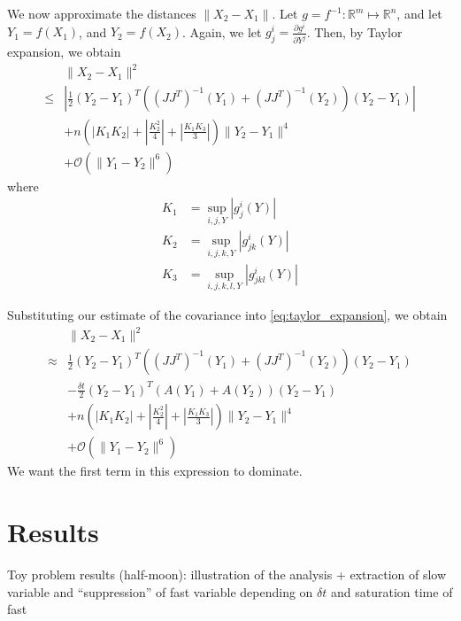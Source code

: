 \documentclass[1p]{elsarticle}
\begin{document}
We now approximate the distances $\| X_2 - X_1 \|$.
%
Let $g = f^{-1}: \mathbb{R}^m \mapsto \mathbb{R}^n$, and let $Y_1 = f(X_1)$, and $Y_2 = f(X_2)$.
%
Again, we let $g_j^i = \frac{\partial g^i}{\partial Y^j}$.
%
Then, by Taylor expansion, we obtain
\begin{equation} \label{eq:taylor_expansion}
\begin{aligned}
&\| X_2 - X_1 \|^2 \\
\le&  \left| \frac{1}{2} (Y_2 - Y_1 )^T ((J J^T)^{-1} (Y_1) + (J J^T)^{-1}(Y_2)) (Y_2 - Y_1 ) \right| \\
& + n \left( \left| K_1 K_2 \right| + \left| \frac{ K_2^2}{4} \right|  + \left| \frac{K_1 K_3}{3} \right|  \right) \| Y_2 - Y_1 \| ^4  \\
& + \mathcal{O} (\|Y_1 - Y_2 \|^6 ) 
\end{aligned}
\end{equation}
%
where
%
\begin{equation}
\begin{aligned}
K_1 &= \sup_{i,j,Y} |g_j^i(Y)|\\
K_2 &= \sup_{i,j,k,Y} |g_{jk}^i(Y)|\\
K_3 &= \sup_{i,j,k,l,Y} |g_{jkl}^i(Y)|
\end{aligned}
\end{equation}

Substituting our estimate of the covariance into \eqref{eq:taylor_expansion}, we obtain
\begin{equation}
\begin{aligned}
&\| X_2 - X_1 \|^2 \\
\approx &  \frac{1}{2} (Y_2 - Y_1)^T \left((J J^T)^{-1}(Y_1)  + (J J^T)^{-1}(Y_2) \right) (Y_2 - Y_1) \\
& - \frac{\delta t}{2} (Y_2 - Y_1)^T \left( A(Y_1) + A(Y_2) \right) (Y_2 - Y_1)\\
& + n \left( \left| K_1 K_2 \right| + \left| \frac{ K_2^2}{4} \right|  + \left| \frac{K_1 K_3}{3} \right|  \right) \| Y_2 - Y_1 \| ^4  \\
& + \mathcal{O} (\|Y_1 - Y_2 \|^6 ) 
\end{aligned}
\end{equation}
%
We want the first term in this expression to dominate.


\section{Results}

 Toy problem results (half-moon): illustration of the analysis + extraction of slow variable and ``suppression'' of fast variable depending on $\delta t$ and saturation time of fast
 
\end{document}
